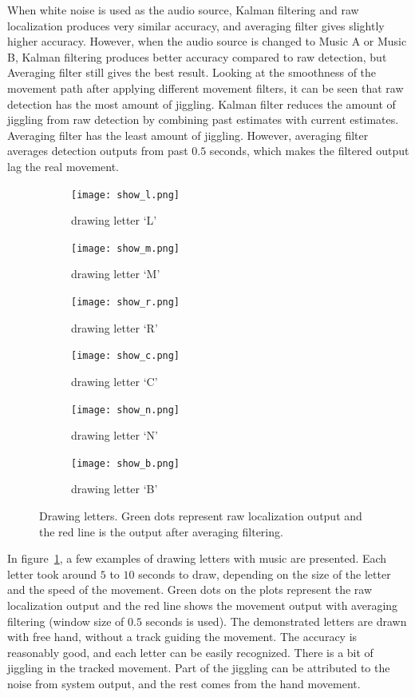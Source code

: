 When white noise is used as the audio source, Kalman filtering and raw localization produces very similar accuracy, and averaging filter gives slightly higher accuracy. However, when the audio source is changed to Music A or Music B, Kalman filtering produces better accuracy compared to raw detection, but Averaging filter still gives the best result. Looking at the smoothness of the movement path after applying different movement filters, it can be seen that raw detection has the most amount of jiggling. Kalman filter reduces the amount of jiggling from raw detection by combining past estimates with current estimates. Averaging filter has the least amount of jiggling. However, averaging filter averages detection outputs from past $0.5$ seconds, which makes the filtered output lag the real movement.

\begin{figure}[h!]
  \centering
  \begin{subfigure}[]{.48\textwidth}
    \texttt{[image: show\_l.png]}
    \caption{drawing letter `L'}
  \end{subfigure}
  \begin{subfigure}[]{.48\textwidth}
    \texttt{[image: show\_m.png]}
    \caption{drawing letter `M'}
  \end{subfigure}

  \begin{subfigure}[]{.48\textwidth}
    \texttt{[image: show\_r.png]}
    \caption{drawing letter `R'}
  \end{subfigure}
  \begin{subfigure}[]{.48\textwidth}
    \texttt{[image: show\_c.png]}
    \caption{drawing letter `C'}
  \end{subfigure}
  \begin{subfigure}[]{.48\textwidth}
    \texttt{[image: show\_n.png]}
    \caption{drawing letter `N'}
  \end{subfigure}
  \begin{subfigure}[]{.48\textwidth}
    \texttt{[image: show\_b.png]}
    \caption{drawing letter `B'}
  \end{subfigure}
  \caption{Drawing letters. Green dots represent raw localization output and the red line is the output after averaging filtering.}
  \label{fig:show_case}
\end{figure}

In figure~\ref{fig:show_case}, a few examples of drawing letters with music are presented. Each letter took around $5$ to $10$ seconds to draw, depending on the size of the letter and the speed of the movement. Green dots on the plots represent the raw localization output and the red line shows the movement output with averaging filtering (window size of $0.5$ seconds is used). The demonstrated letters are drawn with free hand, without a track guiding the movement. The accuracy is reasonably good, and each letter can be easily recognized. There is a bit of jiggling in the tracked movement. Part of the jiggling can be attributed to the noise from system output, and the rest comes from the hand movement. 

